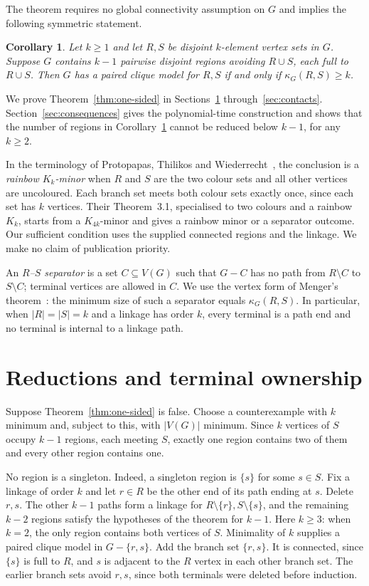 \documentclass[11pt]{amsart}
\newtheorem{corollary}[theorem]{Corollary}
\begin{document}
The theorem requires no global connectivity assumption on $G$ and implies
the following symmetric statement.

\begin{corollary}\label{cor:two-sided}
Let $k\geq1$ and let $R,S$ be disjoint $k$-element vertex sets in $G$.
Suppose $G$ contains $k-1$ pairwise disjoint regions avoiding $R\cup S$,
each full to $R\cup S$. Then $G$ has a paired clique model for $R,S$
if and only if $\kappa_G(R,S)\geq k$.
\end{corollary}

We prove Theorem~\ref{thm:one-sided} in
Sections~\ref{sec:reductions} through~\ref{sec:contacts}.
Section~\ref{sec:consequences} gives the polynomial-time construction
and shows that the number of regions in Corollary~\ref{cor:two-sided}
cannot be reduced below $k-1$, for any $k\geq2$.

In the terminology of Protopapas, Thilikos and
Wiederrecht~\cite[Sections 1.1 and 2.1]{PTW}, the conclusion is a
\emph{rainbow $K_k$-minor} when $R$ and $S$ are the two colour sets
and all other vertices are uncoloured. Each branch set meets both
colour sets exactly once, since each set has $k$ vertices.
Their Theorem~3.1, specialised to two colours and a rainbow
$K_k$, starts from a $K_{4k}$-minor and gives a rainbow minor or a
separator outcome. Our sufficient condition uses the supplied connected
regions and the linkage. We make no claim of publication priority.

An \emph{$R$--$S$ separator} is a set $C\subseteq V(G)$ such that
$G-C$ has no path from $R\setminus C$ to $S\setminus C$; terminal
vertices are allowed in $C$. We use the vertex form of Menger's
theorem~\cite{Menger}: the minimum size of such a separator equals
$\kappa_G(R,S)$. In particular, when $|R|=|S|=k$ and a linkage has
order $k$, every terminal is a path end and no terminal is internal
to a linkage path.

\section{Reductions and terminal ownership}\label{sec:reductions}

Suppose Theorem~\ref{thm:one-sided} is false. Choose a counterexample
with $k$ minimum and, subject to this, with $|V(G)|$ minimum. Since
$k$ vertices of $S$ occupy $k-1$ regions, each meeting $S$, exactly
one region contains two of them and every other region contains one.

No region is a singleton. Indeed, a singleton region is $\{s\}$ for
some $s\in S$. Fix a linkage of order $k$ and let $r\in R$ be the
other end of its path ending at $s$. Delete $r,s$. The other $k-1$
paths form a linkage for $R\setminus\{r\},S\setminus\{s\}$, and the
remaining $k-2$ regions satisfy the hypotheses of the theorem for
$k-1$. Here $k\geq3$: when $k=2$, the only region contains both
vertices of $S$. Minimality of $k$ supplies a paired clique model in
$G-\{r,s\}$. Add the branch set $\{r,s\}$. It is connected, since
$\{s\}$ is full to $R$, and $s$ is adjacent to the $R$ vertex in each
other branch set. The earlier branch sets avoid $r,s$, since both
terminals were deleted before induction.
\end{document}
